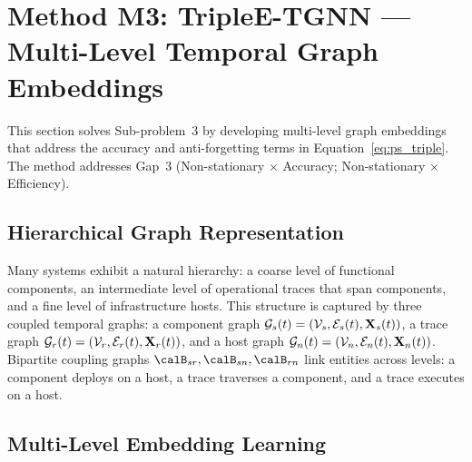 \section{Method M3: TripleE-TGNN --- Multi-Level Temporal Graph Embeddings}
\label{sec:triple_e}

This section solves Sub-problem~3 by developing multi-level graph embeddings that address the accuracy and anti-forgetting terms in Equation~\eqref{eq:ps_triple}. The method addresses Gap~3 (Non-stationary $\times$ Accuracy; Non-stationary $\times$ Efficiency).

\subsection{Hierarchical Graph Representation}

Many systems exhibit a natural hierarchy: a coarse level of functional components, an intermediate level of operational traces that span components, and a fine level of infrastructure hosts. This structure is captured by three coupled temporal graphs: a component graph $\mathcal{G}_s(t)=(\mathcal{V}_s,\mathcal{E}_s(t),\mathbf{X}_s(t))$, a trace graph $\mathcal{G}_r(t)=(\mathcal{V}_r,\mathcal{E}_r(t),\mathbf{X}_r(t))$, and a host graph $\mathcal{G}_n(t)=(\mathcal{V}_n,\mathcal{E}_n(t),\mathbf{X}_n(t))$. Bipartite coupling graphs $\calB_{sr},\calB_{sn},\calB_{rn}$ link entities across levels: a component deploys on a host, a trace traverses a component, and a trace executes on a host.

\subsection{Multi-Level Embedding Learning}

